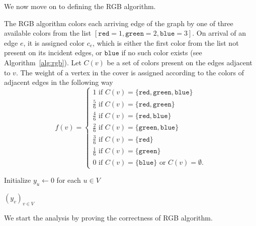 \documentclass[a4paper,USenglish,cleveref,autoref,thm-restate,pdfa]{lipics-v2021}
\newcommand{\cred}{\texttt{red}}
\newcommand{\cblue}{\texttt{blue}}
\newcommand{\cgreen}{\texttt{green}}
\begin{document}
We now move on to defining the RGB algorithm.

\begin{definition}\label{def:rgb}
The RGB algorithm colors each arriving edge of the graph by one of three available colors from the list $[\cred=1, \cgreen=2, \cblue=3]$.
On arrival of an edge $e$, it is assigned color $c_e$, which is either the first color from the list not present on its incident edges,
or $\cblue$ if no such color exists (see Algorithm~\ref{alg:rgb}).
Let $C(v)$ be a set of colors present on the edges adjacent to $v$. The weight of a vertex in the cover is assigned according
to the colors of adjacent edges in the following way
\begin{equation*}
f(v)=
\begin{cases}
1 \text{ if } C(v)=\{ \cred, \cgreen, \cblue \}\\
\frac{5}{6} \text{ if } C(v)=\{ \cred, \cgreen \}\\
\frac{4}{6} \text{ if } C(v)=\{ \cred, \cblue \}\\
\frac{2}{6} \text{ if } C(v)=\{ \cgreen, \cblue \}\\
\frac{3}{6} \text{ if } C(v)=\{ \cred \}\\
\frac{1}{6} \text{ if } C(v)=\{ \cgreen \}\\
0 \text{ if } C(v)=\{ \cblue \} \text{ or } C(v)=\emptyset.
\end{cases}
\end{equation*}
\end{definition}

\begin{algorithm}
\caption{RGB Algorithm}
  \label{alg:rgb}
  Initialize \( y_u \gets 0 \) for each \( u \in V \)\\

  \Return $(y_v)_{v \in V}$
\end{algorithm}

We start the analysis by proving the correctness of RGB algorithm.
\end{document}
